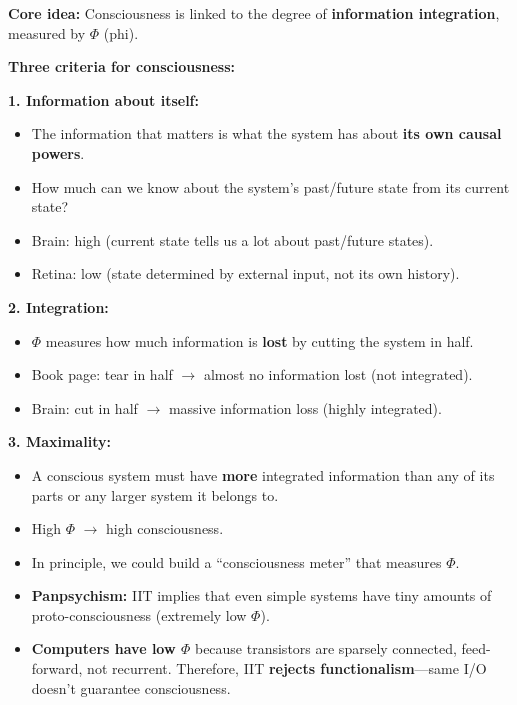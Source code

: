 \begin{defbox}
\textbf{Core idea:} Consciousness is linked to the degree of \textbf{information integration}, measured by $\Phi$ (phi).

\textbf{Three criteria for consciousness:}

\textbf{1. Information about itself:}
\begin{itemize}
  \item The information that matters is what the system has about \textbf{its own causal powers}.
  \item How much can we know about the system's past/future state from its current state?
  \item Brain: high (current state tells us a lot about past/future states).
  \item Retina: low (state determined by external input, not its own history).
\end{itemize}

\textbf{2. Integration:}
\begin{itemize}
  \item $\Phi$ measures how much information is \textbf{lost} by cutting the system in half.
  \item Book page: tear in half $\to$ almost no information lost (not integrated).
  \item Brain: cut in half $\to$ massive information loss (highly integrated).
\end{itemize}

\textbf{3. Maximality:}
\begin{itemize}
  \item A conscious system must have \textbf{more} integrated information than any of its parts or any larger system it belongs to.
\end{itemize}
\end{defbox}

\begin{thmbox}
\begin{itemize}
  \item High $\Phi$ $\to$ high consciousness.
  \item In principle, we could build a ``consciousness meter'' that measures $\Phi$.
  \item \textbf{Panpsychism:} IIT implies that even simple systems have tiny amounts of proto-consciousness (extremely low $\Phi$).
  \item \textbf{Computers have low $\Phi$} because transistors are sparsely connected, feed-forward, not recurrent. Therefore, IIT \textbf{rejects functionalism}---same I/O doesn't guarantee consciousness.
\end{itemize}
\end{thmbox}

